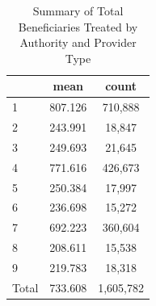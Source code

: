 \begin{table}[htbp]\centering
\def\sym#1{\ifmmode^{#1}\else\(^{#1}\)\fi}
\caption{Summary of Total Beneficiaries Treated by Authority and Provider Type}
\begin{tabular}{l*{1}{cc}}
\toprule
                    &        mean&       count\\
\midrule
1                   &     807.126&     710,888\\
2                   &     243.991&      18,847\\
3                   &     249.693&      21,645\\
4                   &     771.616&     426,673\\
5                   &     250.384&      17,997\\
6                   &     236.698&      15,272\\
7                   &     692.223&     360,604\\
8                   &     208.611&      15,538\\
9                   &     219.783&      18,318\\
Total               &     733.608&   1,605,782\\
\bottomrule
\end{tabular}
\end{table}
